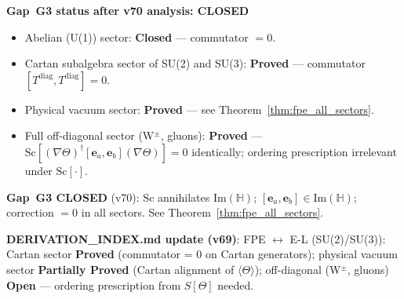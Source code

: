 \documentclass[12pt,a4paper]{article}
\theoremstyle{definition}
\theoremstyle{remark}
\begin{document}
\begin{gapbox}
\textbf{Gap~G3 status after v70 analysis: \textcolor{green!60!black}{CLOSED}}

\begin{itemize}
  \item Abelian (U(1)) sector: \textbf{Closed} — commutator $= 0$.
  \item Cartan subalgebra sector of SU(2) and SU(3):
        \textbf{Proved} — commutator $[T^{\text{diag}}, T^{\text{diag}}] = 0$.
  \item Physical vacuum sector: \textbf{Proved} — see Theorem~\ref{thm:fpe_all_sectors}.
  \item Full off-diagonal sector (W$^\pm$, gluons): \textbf{Proved} —
        $\mathrm{Sc}[(\nabla\Theta)^\dagger[\mathbf{e}_a,\mathbf{e}_b](\nabla\Theta)] = 0$
        identically; ordering prescription irrelevant under $\mathrm{Sc}[\cdot]$.
\end{itemize}

\medskip
\textbf{Gap~G3 CLOSED} (v70): $\mathrm{Sc}$ annihilates $\mathrm{Im}(\mathbb{H})$;
$[\mathbf{e}_a,\mathbf{e}_b] \in \mathrm{Im}(\mathbb{H})$; correction $= 0$
in all sectors.  See Theorem~\ref{thm:fpe_all_sectors}.
\end{gapbox}

\textbf{DERIVATION\_INDEX.md update (v69)}: FPE $\leftrightarrow$ E-L
(SU(2)/SU(3)): Cartan sector \textbf{Proved} (commutator = 0 on Cartan
generators); physical vacuum sector \textbf{Partially Proved} (Cartan
alignment of $\langle\Theta\rangle$); off-diagonal (W$^\pm$, gluons)
\textbf{Open} — ordering prescription from $S[\Theta]$ needed.

\ifdefined\INCLUDEMODE
\else
  
\end{document}
